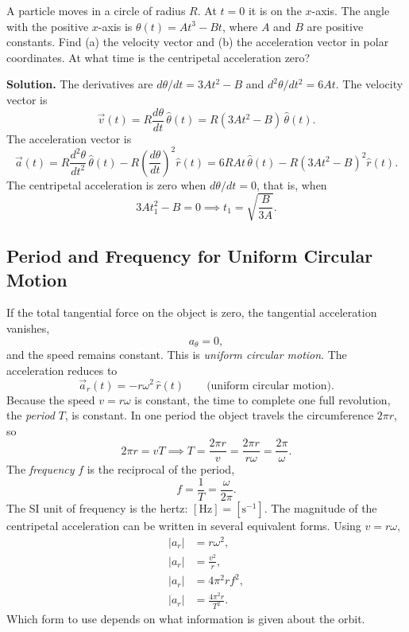 \begin{workedexample}
A particle moves in a circle of radius $R$. At $t = 0$ it is on the $x$-axis. The angle with the positive $x$-axis is $\theta(t) = At^3 - Bt$, where $A$ and $B$ are positive constants. Find (a) the velocity vector and (b) the acceleration vector in polar coordinates. At what time is the centripetal acceleration zero?

\noindent\textbf{Solution.}
The derivatives are $d\theta/dt = 3At^2 - B$ and $d^2\theta/dt^2 = 6At$. The velocity vector is
\[
    \vec{v}(t) = R\frac{d\theta}{dt}\,\hat{\theta}(t) = R(3At^2 - B)\,\hat{\theta}(t).
\]
The acceleration vector is
\[
    \vec{a}(t) = R\frac{d^2\theta}{dt^2}\,\hat{\theta}(t) - R\left(\frac{d\theta}{dt}\right)^2\hat{r}(t) = 6RAt\,\hat{\theta}(t) - R(3At^2 - B)^2\hat{r}(t).
\]
The centripetal acceleration is zero when $d\theta/dt = 0$, that is, when
\[
    3At_1^2 - B = 0 \implies t_1 = \sqrt{\frac{B}{3A}}.
\]
\end{workedexample}

\subsection{Period and Frequency for Uniform Circular Motion}

If the total tangential force on the object is zero, the tangential acceleration vanishes,
\begin{equation}
    a_\theta = 0,
\end{equation}
and the speed remains constant. This is \textit{uniform circular motion}. The acceleration reduces to
\begin{equation}
    \vec{a}_r(t) = -r\omega^2\,\hat{r}(t) \qquad \text{(uniform circular motion)}.
\end{equation}
Because the speed $v = r\omega$ is constant, the time to complete one full revolution, the \textit{period} $T$, is constant. In one period the object travels the circumference $2\pi r$, so
\begin{equation}
    2\pi r = vT \implies T = \frac{2\pi r}{v} = \frac{2\pi r}{r\omega} = \frac{2\pi}{\omega}.
\end{equation}
The \textit{frequency} $f$ is the reciprocal of the period,
\begin{equation}
    f = \frac{1}{T} = \frac{\omega}{2\pi}.
\end{equation}
The SI unit of frequency is the hertz: $[\mathrm{Hz}] = [\mathrm{s}^{-1}]$. The magnitude of the centripetal acceleration can be written in several equivalent forms. Using $v = r\omega$,
\begin{align}
    |a_r| &= r\omega^2, \label{eq:ar1}\\
    |a_r| &= \frac{v^2}{r}, \label{eq:ar2}\\
    |a_r| &= 4\pi^2 r f^2, \label{eq:ar3}\\
    |a_r| &= \frac{4\pi^2 r}{T^2}. \label{eq:ar4}
\end{align}
Which form to use depends on what information is given about the orbit.

